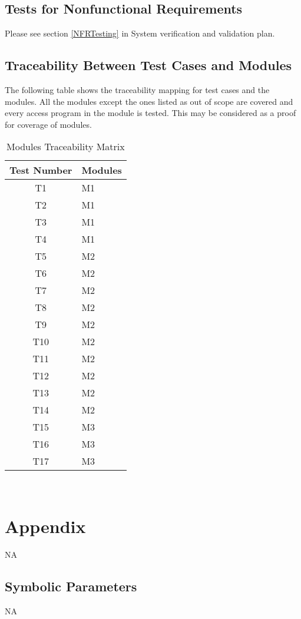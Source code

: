 \documentclass[12pt, titlepage]{article}
\begin{document}
\begin{enumerate}
\subsection{Tests for Nonfunctional Requirements}

Please see section \ref{NFRTesting} in System verification and validation plan.

\subsection{Traceability Between Test Cases and Modules}


The following table shows the traceability mapping for test cases and the 
modules. All the modules except the ones listed as out of scope are covered and 
every access program in the module is tested. This may be considered as a proof 
for coverage of modules.

\begin{table} [H]
	\caption{Modules Traceability Matrix}
	\label{Table:Table_Traceability}  
	\begin{tabular}{|c|p{5cm}|}
		\hline	
		\textbf{Test Number} & \textbf{Modules} \\
		\hline 
		T1&  M1      \\ \hline
		T2&   M1      \\ \hline
		T3&   M1     \\ \hline
		T4&   M1     \\ \hline
		T5&   M2      \\ \hline
		T6&   M2     \\ \hline
		T7&   M2     \\ \hline
		T8&   M2      \\ \hline
		T9&   M2     \\ \hline
		T10&  M2      \\ \hline
		T11&   M2      \\ \hline
		T12&   M2     \\ \hline
		T13&   M2     \\ \hline
		T14&   M2      \\ \hline
		T15&   M3     \\ \hline
		T16&   M3     \\ \hline
		T17&   M3      \\ \hline
		
	\end{tabular}\\
\end{table}











\newpage

\section{Appendix}

NA

\subsection{Symbolic Parameters}

NA


\end{enumerate}
\end{document}
